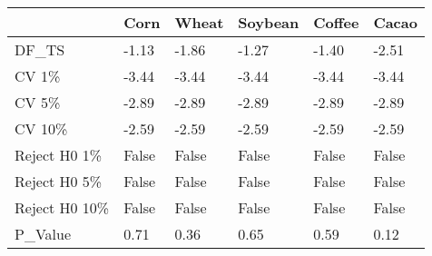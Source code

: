 \begin{tabular}{llllll}
\toprule
{} &   Corn &  Wheat & Soybean & Coffee &  Cacao \\
\midrule
DF\_TS         &  -1.13 &  -1.86 &   -1.27 &  -1.40 &  -2.51 \\
CV 1\%         &  -3.44 &  -3.44 &   -3.44 &  -3.44 &  -3.44 \\
CV 5\%         &  -2.89 &  -2.89 &   -2.89 &  -2.89 &  -2.89 \\
CV 10\%        &  -2.59 &  -2.59 &   -2.59 &  -2.59 &  -2.59 \\
Reject H0 1\%  &  False &  False &   False &  False &  False \\
Reject H0 5\%  &  False &  False &   False &  False &  False \\
Reject H0 10\% &  False &  False &   False &  False &  False \\
P\_Value       &   0.71 &   0.36 &    0.65 &   0.59 &   0.12 \\
\bottomrule
\end{tabular}
